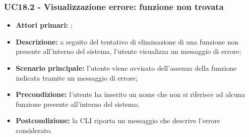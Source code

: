 \subsubsection{UC18.2 - Visualizzazione errore: funzione non trovata}
\begin{itemize}
	\item \textbf{Attori primari:} \us{};
	\item \textbf{Descrizione:} a seguito del tentativo di eliminazione di una funzione non presente all’interno del sistema, l’utente visualizza un messaggio di errore;  
	\item \textbf{Scenario principale:} l’utente viene avvisato dell’assenza della funzione indicata tramite un messaggio di errore;
	\item \textbf{Precondizione:} l’utente ha inserito un nome che non si riferisce ad alcuna funzione presente all’interno del sistema;
	\item \textbf{Postcondizione:} la CLI riporta un messaggio che descrive l’errore considerato.
\end{itemize}